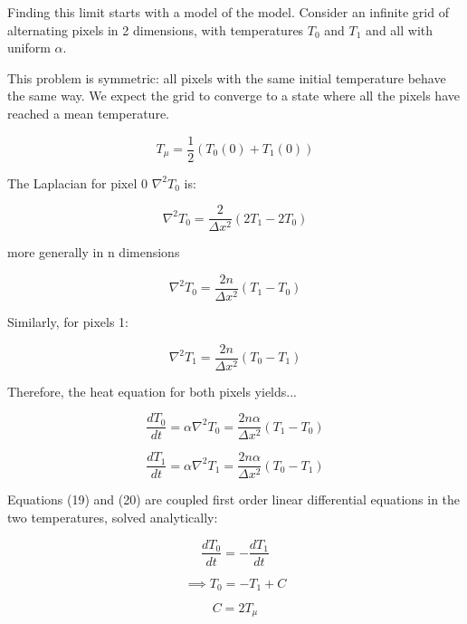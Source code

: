 \documentclass{article}
\begin{document}
Finding this limit starts with a model of the model. Consider an infinite grid of alternating pixels in 2 dimensions, with temperatures $T_0$ and $T_1$ and all with uniform $\alpha$.

This problem is symmetric: all pixels with the same initial temperature behave the same way. We expect the grid to converge to a state where all the pixels have reached a mean temperature.

\begin{equation}
    T_\mu = \frac{1}{2}(T_0(0)+T_1(0))
\end{equation}

The Laplacian for pixel 0 $\nabla^2 T_0$ is:

\begin{equation}
    \nabla^2 T_0 = \frac{2}{\Delta x^2}(2T_1-2T_0)
\end{equation}

more generally in n dimensions

\begin{equation}
    \nabla^2 T_0 = \frac{2n}{\Delta x^2}(T_1-T_0)
\end{equation}

Similarly, for pixels 1:

\begin{equation}
    \nabla^2 T_1 = \frac{2n}{\Delta x^2}(T_0-T_1)
\end{equation}

Therefore, the heat equation for both pixels yields...

\begin{equation}
    \frac{dT_0}{dt} = \alpha\nabla^2 T_0 = \frac{2n\alpha}{\Delta x^2}(T_1-T_0)
\end{equation}

\begin{equation}
    \frac{dT_1}{dt} = \alpha\nabla^2 T_1 = \frac{2n\alpha}{\Delta x^2}(T_0-T_1)
\end{equation}

Equations (19) and (20) are coupled first order linear differential equations in the two temperatures, solved analytically:

\begin{equation*}
    \frac{dT_0}{dt} =-\frac{dT_1}{dt}
\end{equation*}

\begin{equation*}
    \implies T_0=-T_1+C
\end{equation*}

\begin{equation}
    C = 2T_\mu
\end{equation}
\end{document}
